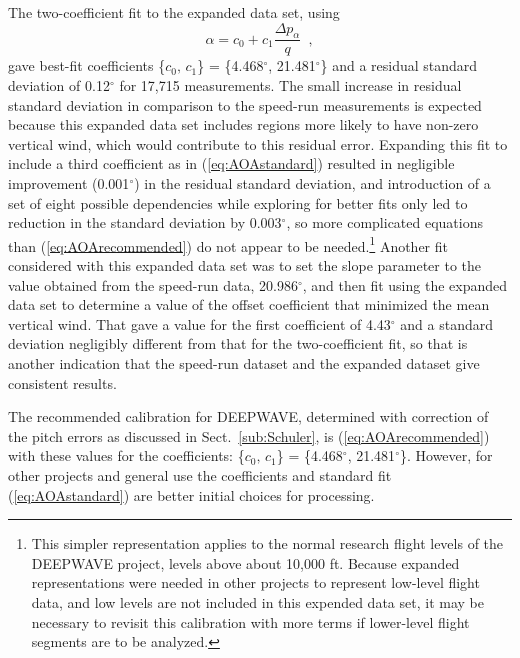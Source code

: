 \documentclass[12pt,twoside,english]{article}\usepackage[]{graphicx}\usepackage[]{color}
\let\OrgIndex\index
\renewcommand*{\index}[1]{\OrgIndex{#1}}
\begin{document}
The two-coefficient fit to the expanded data set, using\\ 
\begin{equation}
\alpha=c_{0}+c_{1}\frac{\Delta p_{\alpha}}{q}\,\,\,,\label{eq:AOArecommended} 
\end{equation}
gave best-fit coefficients 
\{$c_{0},\, c_{1}$\} = \{4.468$^{\circ}$, 21.481$^{\circ}$\}  
and a residual standard deviation of 0.12$^{\circ}$  
for 17,715 measurements. The small increase in residual standard deviation in comparison to the speed-run measurements is expected because this expanded data set includes regions more likely to have non-zero vertical wind, which would contribute to this residual error. Expanding this fit to include a third coefficient as in (\ref{eq:AOAstandard}) resulted in negligible improvement (0.001$^{\circ}$) in the residual standard deviation, and introduction of a set of eight possible dependencies while exploring for better fits only led to reduction in the standard deviation by 0.003$^{\circ}$, so more complicated equations than (\ref{eq:AOArecommended}) do not appear to be needed.\footnote{This simpler representation applies to the normal research flight levels of the DEEPWAVE project, levels above about 10,000 ft. Because expanded representations were needed in other projects to represent low-level flight data, and low levels are not included in this expended data set, it may be necessary to revisit this calibration with more terms if lower-level flight segments are to be analyzed.} Another fit considered with this expanded data set was to set the slope parameter to the value obtained from the speed-run data, 20.986$^{\circ}$, and then fit using the expanded data set to determine a value of the offset coefficient that minimized the mean vertical wind. That gave a value for the first coefficient of 4.43$^{\circ}$ and a standard deviation negligibly different from that for the two-coefficient fit, so that is another indication that the speed-run dataset and the expanded dataset give consistent results.  

The recommended calibration for DEEPWAVE, determined with correction of the pitch errors as discussed in Sect.~\ref{sub:Schuler}, is (\ref{eq:AOArecommended}) with these values for the coefficients: \{$c_{0},\, c_{1}$\} = \{4.468$^{\circ}$, 21.481$^{\circ}$\}.\label{page:aoarec} 
However, for other projects and general use the coefficients and standard fit
(\ref{eq:AOAstandard}) are better initial choices for processing.
\end{document}
